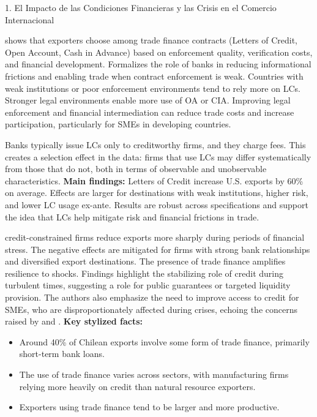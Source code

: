 \documentclass[11pt]{article}
\begin{document}
1. El Impacto de las Condiciones Financieras y las Crisis en el Comercio Internacional

\citet{SchmidtEisenlohr2013} shows that exporters choose among trade finance contracts (Letters of Credit, Open Account, Cash in Advance) based on enforcement quality, verification costs, and financial development.  Formalizes the role of banks in reducing informational frictions and enabling trade when contract enforcement is weak.  Countries with weak institutions or poor enforcement environments tend to rely more on LCs. Stronger legal environments enable more use of OA or CIA.  Improving legal enforcement and financial intermediation can reduce trade costs and increase participation, particularly for SMEs in developing countries.

    \citep{Niepmann2017} Banks typically issue LCs only to creditworthy firms, and they charge fees. This creates a selection effect in the data: firms that use LCs may differ systematically from those that do not, both in terms of observable and unobservable characteristics. \textbf{Main findings:} Letters of Credit increase U.S. exports by 60\% on average. Effects are larger for destinations with weak institutions, higher risk, and lower LC usage ex-ante. Results are robust across specifications and support the idea that LCs help mitigate risk and financial frictions in trade.

\citep{Calani2025} credit-constrained firms reduce exports more sharply during periods of financial stress. The negative effects are mitigated for firms with strong bank relationships and diversified export destinations. The presence of trade finance amplifies resilience to shocks. Findings highlight the stabilizing role of credit during turbulent times, suggesting a role for public guarantees or targeted liquidity provision. The authors also emphasize the need to improve access to credit for SMEs, who are disproportionately affected during crises, echoing the concerns raised by \citep{Auboin2009} and \citep{Asmundson2011}.
\textbf{Key stylized facts:} 
\begin{itemize}
    \item Around 40\% of Chilean exports involve some form of trade finance, primarily short-term bank loans.
    \item The use of trade finance varies across sectors, with manufacturing firms relying more heavily on credit than natural resource exporters.
    \item Exporters using trade finance tend to be larger and more productive.
\end{itemize}
\end{document}
